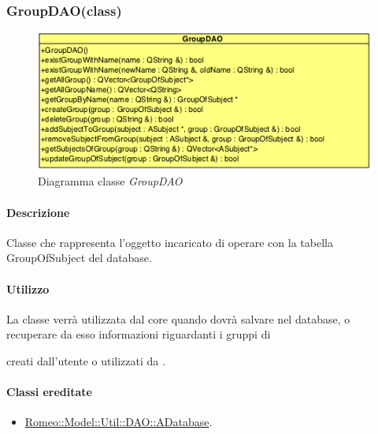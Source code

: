 \subsubsection{GroupDAO(class)}
\label{spegroupdao}
\begin{figure}[!h]
\centering
			\includegraphics[scale=1]{./Content/Immagini/model/GroupDAO.png}
			\caption{Diagramma classe \textsl{GroupDAO}}
			\label{cl_groupdao}
\end{figure}

\paragraph{Descrizione \\}
Classe che rappresenta l'oggetto incaricato di operare con la tabella GroupOfSubject del database.

\paragraph{Utilizzo\\}
La classe verrà utilizzata dal core quando dovrà salvare nel database, o recuperare da esso informazioni riguardanti i gruppi di \subject{} creati dall'utente o utilizzati da \project.

\paragraph{Classi ereditate\\}
\begin{itemize}
\item \hyperref[speadatabase]{Romeo::Model::Util::DAO::ADatabase}.
\end{itemize}

